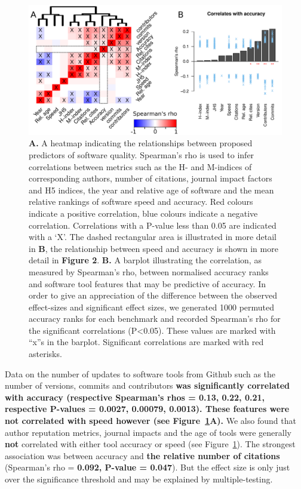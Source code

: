 \documentclass[fleqn,10pt]{SelfArx} %
\begin{document}
\begin{figure}[h]
\includegraphics[width=\textwidth]{figure1.pdf}
\caption{\textbf{A.} A heatmap indicating the relationships between
  proposed predictors of software quality. Spearman’s rho is used to
  infer correlations between metrics such as the H- and M-indices of
  corresponding authors, number of citations, journal impact factors
  and H5 indices, the year and relative age of software and the mean
  relative rankings of software speed and accuracy. Red colours
  indicate a positive correlation, blue colours indicate a negative
  correlation. Correlations with a P-value less than 0.05 are
  indicated with a ‘X’. The dashed rectangular area is illustrated in
  more detail in \textbf{B}, the relationship between speed and
  accuracy is shown in more detail in \textbf{Figure 2}.
  \textbf{B.} A barplot illustrating the correlation, as measured by
  Spearman’s rho, between normalised accuracy ranks and software tool
  features that may be predictive of accuracy. In order to give an
  appreciation of the difference between the observed effect-sizes and
  significant effect sizes, we generated 1000 permuted accuracy ranks
  for each benchmark and recorded Spearman’s rho for the significant
  correlations (P<0.05). These values are marked with “x”s in the
  barplot. Significant correlations are marked with red asterisks.}
\label{fig:allfactors}
\end{figure}

Data on the
number of updates to software tools from Github such as the number of versions,
commits and contributors \textbf{{\color{red}was significantly correlated with 
accuracy (respective Spearman’s rhos = 0.13, 0.22, 0.21, respective P-values = 0.0027, 0.00079, 0.0013). 
These features were not correlated with speed however (see Figure~\ref{fig:allfactors}A).
}}
We also found that author reputation metrics, journal impacts and the age
of tools were generally \textbf{not} correlated with either tool
accuracy or speed (see Figure~\ref{fig:allfactors}). The strongest
association was between accuracy and \textbf{{\color{red}the relative
    number of citations}} (Spearman’s rho = \textbf{{\color{red}0.092,
    P-value = 0.047}}). But the effect size is only just over the
significance threshold and may be explained by multiple-testing. 
    
\end{document}
